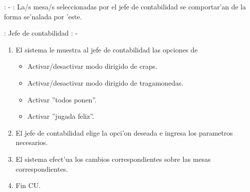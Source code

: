 : - \newline
\indent{}: La/s mesa/s seleccionadas por el jefe de contabilidad se comportar'an de la forma se'nalada por 'este.

: Jefe de contabilidad \newline
\indent{}: -

\begin{enumerate}
\item El sistema le muestra al jefe de contabilidad las opciones de
	\begin{itemize}
	\item Activar/desactivar modo dirigido de craps.
	\item Activar/desactivar modo dirigido de tragamonedas.
	\item Activar ''todos ponen''.
	\item Activar ''jugada feliz''.
	\end{itemize}
\item El jefe de contabilidad elige la opci'on deseada e ingresa los parametros necesarios.
\item El sistema efect'ua los cambios correspondientes sobre las mesas correspondientes.
\item Fin CU.
\end{enumerate}


